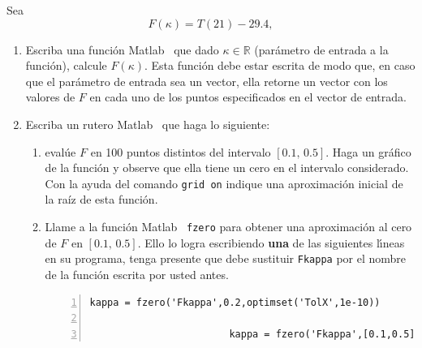 \documentclass[letter,11pt]{article}
\newcommand\R{\mathbb{R}}
\newcommand\0{\mathbf{0}}
\newcommand{\matlab}{{\sc Matlab} }
\begin{document}
		Sea
		\[
			F(\kappa) = T(21) - 29.4,
		\]
		\begin{enumerate}
			\item \label{funcionF} Escriba una funci\'on \matlab\, que dado $\kappa \in \R$ (par\'ametro de entrada
				a la funci\'on), calcule $F(\kappa)$. Esta funci\'on debe estar
				escrita de modo que, en caso que el par\'ametro de entrada sea un vector, ella
				retorne un vector con los valores de $F$ en cada uno de los puntos especificados
				en el vector de entrada.

			\item \label{encontrarkappa} Escriba un rutero \matlab\, que haga lo siguiente:
				
				\begin{enumerate}
					\item eval\'ue $F$ en 100 puntos distintos del intervalo $[0.1,\,0.5]$. Haga un gr\'afico de
						la funci\'on y observe que ella tiene un cero en el intervalo considerado. Con la ayuda del comando \verb+grid on+ indique una aproximaci\'on inicial de la ra\'iz de esta funci\'on.

					\item Llame a la funci\'on \matlab\, \verb+fzero+
						para obtener una aproximaci\'on al cero de $F$ en $[0.1,\,0.5]$.
						Ello lo logra escribiendo {\bf una} de las siguientes l\'{\i}neas en su programa, tenga
						presente que debe sustituir \verb+Fkappa+ por el nombre de la funci\'on escrita por usted antes.

						\medskip
							
						\begin{Verbatim}[gobble=6,frame=single,numbers=left]
						kappa = fzero('Fkappa',0.2,optimset('TolX',1e-10))

						kappa = fzero('Fkappa',[0.1,0.5],optimset('TolX',1e-10))
						\end{Verbatim}
						
						\medskip


\end{enumerate}
\end{enumerate}
\end{document}
